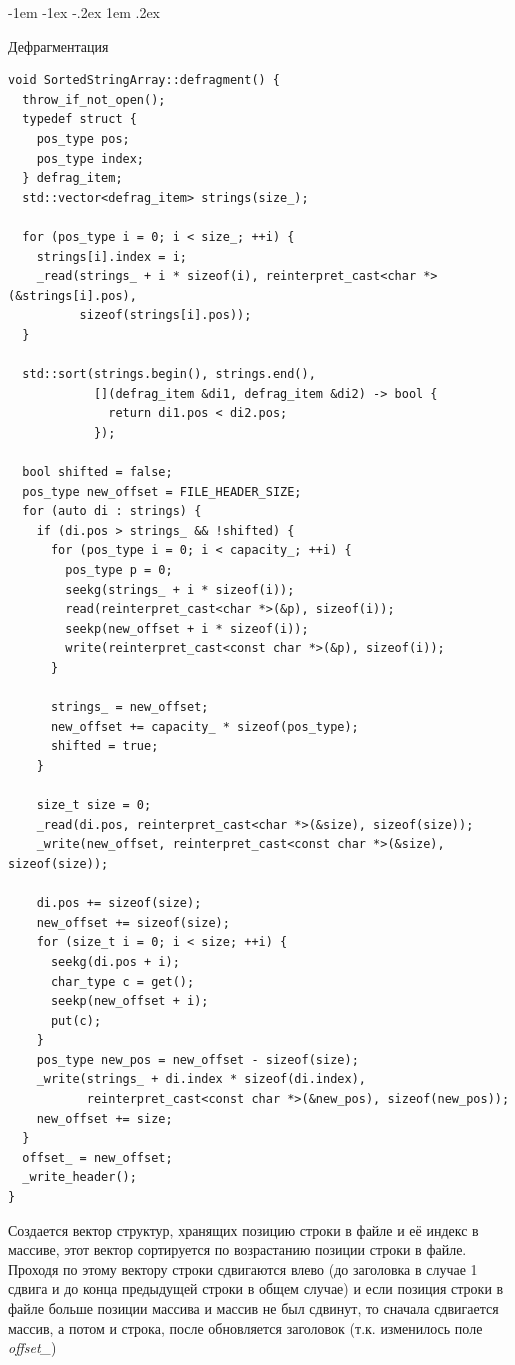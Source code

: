 \documentclass[a4paper,14pt,oneside,final]{extreport}
\makeatletter
\newlength{\fivecharsapprox}
\renewcommand\subsection{%
  \@startsection{subsection}{2}%
    {\fivecharsapprox}%
    {-1em \@plus -1ex \@minus -.2ex}%
    {1em \@plus .2ex}%
    {\raggedright\hyphenpenalty=10000\normalfont\normalsize\bfseries}}
\makeatother
\begin{document}
\subsection{Дефрагментация}\label{sec:defrag}
\begin{verbatim}
void SortedStringArray::defragment() {
  throw_if_not_open();
  typedef struct {
    pos_type pos;
    pos_type index;
  } defrag_item;
  std::vector<defrag_item> strings(size_);

  for (pos_type i = 0; i < size_; ++i) {
    strings[i].index = i;
    _read(strings_ + i * sizeof(i), reinterpret_cast<char *>(&strings[i].pos),
          sizeof(strings[i].pos));
  }

  std::sort(strings.begin(), strings.end(),
            [](defrag_item &di1, defrag_item &di2) -> bool {
              return di1.pos < di2.pos;
            });

  bool shifted = false;
  pos_type new_offset = FILE_HEADER_SIZE;
  for (auto di : strings) {
    if (di.pos > strings_ && !shifted) {
      for (pos_type i = 0; i < capacity_; ++i) {
        pos_type p = 0;
        seekg(strings_ + i * sizeof(i));
        read(reinterpret_cast<char *>(&p), sizeof(i));
        seekp(new_offset + i * sizeof(i));
        write(reinterpret_cast<const char *>(&p), sizeof(i));
      }

      strings_ = new_offset;
      new_offset += capacity_ * sizeof(pos_type);
      shifted = true;
    }

    size_t size = 0;
    _read(di.pos, reinterpret_cast<char *>(&size), sizeof(size));
    _write(new_offset, reinterpret_cast<const char *>(&size), sizeof(size));

    di.pos += sizeof(size);
    new_offset += sizeof(size);
    for (size_t i = 0; i < size; ++i) {
      seekg(di.pos + i);
      char_type c = get();
      seekp(new_offset + i);
      put(c);
    }
    pos_type new_pos = new_offset - sizeof(size);
    _write(strings_ + di.index * sizeof(di.index),
           reinterpret_cast<const char *>(&new_pos), sizeof(new_pos));
    new_offset += size;
  }
  offset_ = new_offset;
  _write_header();
}
\end{verbatim}
Создается вектор структур, хранящих позицию строки в файле и её индекс в массиве, этот вектор сортируется по возрастанию позиции строки в файле. Проходя по этому вектору строки сдвигаются влево (до заголовка в случае 1 сдвига и до конца предыдущей строки в общем случае) и если позиция строки в файле больше позиции массива и массив не был сдвинут, то сначала сдвигается массив, а потом и строка, после обновляется заголовок (т.к. изменилось поле \textit{offset\_})
\end{document}
